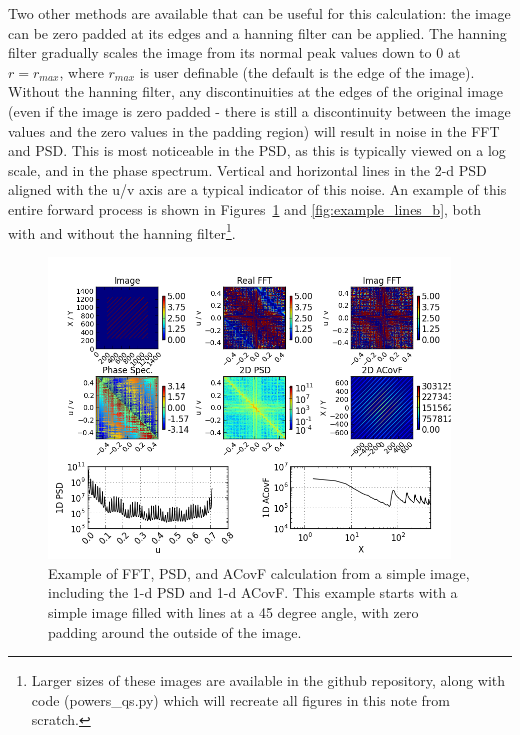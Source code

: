 \documentclass[11pt,preprint]{aastex}
\begin{document}
Two other methods are available that can be useful for this calculation: the image can be zero padded at its edges and a hanning filter can be applied. The hanning filter gradually scales the image from its normal peak values down to 0 at $r=r_{max}$, where $r_{max}$ is user definable (the default is the edge of the image). Without the hanning filter, any discontinuities at the edges of the original image (even if the image is zero padded - there is still a discontinuity between the image values and the zero values in the padding region) will result in noise in the FFT and PSD. This is most noticeable in the PSD, as this is typically viewed on a log scale, and in the phase spectrum. Vertical and horizontal lines in the 2-d PSD aligned with the u/v axis are a typical indicator of this noise.  An example of this entire forward process is shown in Figures~\ref{fig:example_lines_a} and \ref{fig:example_lines_b}, both with and without the hanning filter\footnote{Larger sizes of these images are available in the github repository, along with code (powers\_qs.py) which will recreate all figures in this note from scratch.}.  

\begin{figure}[htbp]
\centering
\includegraphics[width=4.2in]{example_lines_a}
\caption{{\small
Example of FFT, PSD, and ACovF calculation from a simple image, including the 1-d PSD and 1-d ACovF.  This example starts with a simple image filled with lines at a 45 degree angle, with zero padding around the outside of the image.  }}
\label{fig:example_lines_a}
\end{figure}
\end{document}
